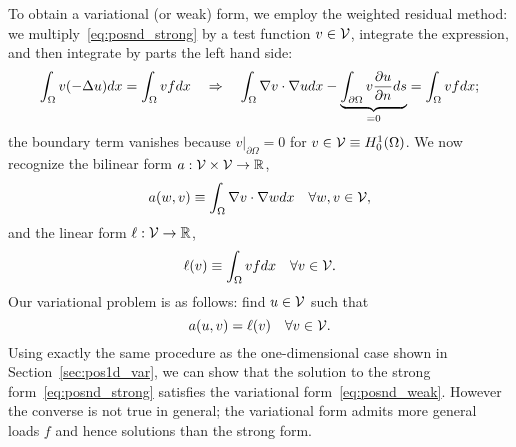 To obtain a variational (or weak) form, we employ the weighted residual method: we multiply~\eqref{eq:posnd_strong} by a test function $v \in \mathcal{V}$, integrate the expression, and then integrate by parts the left hand side:
\begin{equation*}
  \int_\Omega v (-\Delta u) dx = \int_\Omega v f dx \quad \Rightarrow \quad
  \int_\Omega \nabla v \cdot \nabla u dx - \underbrace{ \int_{\partial \Omega} v \frac{\partial u}{\partial n} ds}_{ = 0}  = \int_\Omega v f dx;
\end{equation*}
the boundary term vanishes because $v|_{\partial \Omega} = 0$ for $v \in \mathcal{V} \equiv H^1_0(\Omega)$.  We now recognize the bilinear form $a: \mathcal{V} \times \mathcal{V} \to \mathbb{R}$,
\begin{equation*}
  a(w,v) \equiv \int_\Omega \nabla v \cdot \nabla w dx \quad \forall w,v \in \mathcal{V},
\end{equation*}
and the linear form $\ell: \mathcal{V} \to \mathbb{R}$,
\begin{equation*}
  \ell(v) \equiv \int_\Omega v f dx \quad \forall v \in \mathcal{V}.
\end{equation*}
Our variational problem is as follows: find $u \in \mathcal{V}$ such that
\begin{equation}
  a(u,v) = \ell(v) \quad \forall v \in \mathcal{V}. \label{eq:posnd_weak}
\end{equation}
 Using exactly the same procedure as the one-dimensional case shown in Section~\ref{sec:pos1d_var}, we can show that the solution to the strong form~\eqref{eq:posnd_strong} satisfies the variational form~\eqref{eq:posnd_weak}.  However the converse is not true in general; the variational form admits more general loads $f$ and hence solutions than the strong form.


